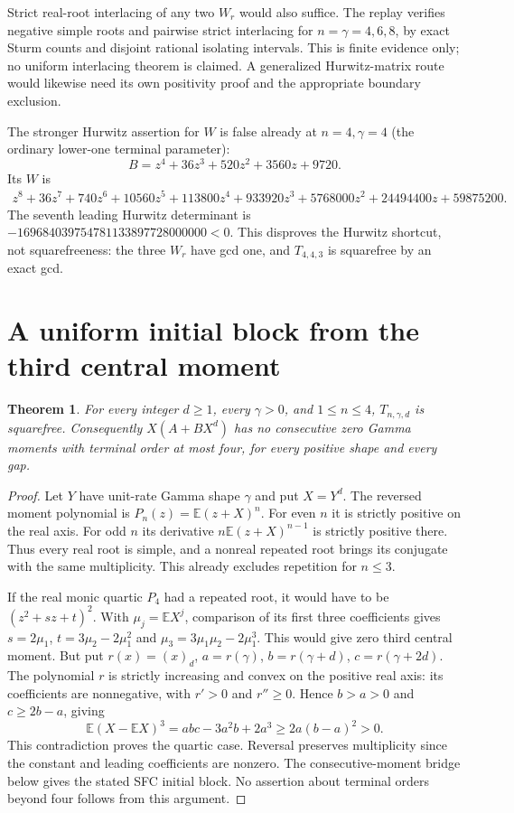 \documentclass[11pt]{article}
\newtheorem{theorem}{Theorem}
\begin{document}
Strict real-root interlacing of any two $W_r$ would also suffice.
The replay verifies negative simple roots and pairwise strict interlacing
for $n=\gamma=4,6,8$, by exact Sturm counts and disjoint rational
isolating intervals. This is finite evidence only; no uniform interlacing
theorem is claimed. A generalized Hurwitz-matrix route would likewise
need its own positivity proof and the appropriate boundary exclusion.

The stronger Hurwitz assertion for $W$ is false already at
$n=4,\gamma=4$ (the ordinary lower-one terminal parameter):
\[
 B=z^4+36z^3+520z^2+3560z+9720.
\]
Its $W$ is
\begin{align*}
 z^8+36z^7+740z^6+10560z^5+113800z^4
 +933920z^3+5768000z^2+24494400z+59875200.
\end{align*}
The seventh leading Hurwitz determinant is
$-169684039754781133897728000000<0$.
This disproves the Hurwitz shortcut, not squarefreeness: the three
$W_r$ have gcd one, and $T_{4,4,3}$ is squarefree by an exact gcd.

\section{A uniform initial block from the third central moment}
\begin{theorem}\label{thm:initial}
For every integer $d\ge1$, every $\gamma>0$, and $1\le n\le4$,
$T_{n,\gamma,d}$ is squarefree. Consequently $X(A+BX^d)$ has no
consecutive zero Gamma moments with terminal order at most four,
for every positive shape and every gap.
\end{theorem}
\begin{proof}
Let $Y$ have unit-rate Gamma shape $\gamma$ and put $X=Y^d$.
The reversed moment polynomial is $P_n(z)=\mathbb E(z+X)^n$.
For even $n$ it is strictly positive on the real axis. For odd $n$
its derivative $n\mathbb E(z+X)^{n-1}$ is strictly positive there.
Thus every real root is simple, and a nonreal repeated root brings its
conjugate with the same multiplicity. This already excludes repetition
for $n\le3$.

If the real monic quartic $P_4$ had a repeated root, it would have to be
$(z^2+sz+t)^2$. With $\mu_j=\mathbb EX^j$, comparison of its first
three coefficients gives $s=2\mu_1$, $t=3\mu_2-2\mu_1^2$ and
$\mu_3=3\mu_1\mu_2-2\mu_1^3$. This would give zero third central moment.
But put $r(x)=(x)_d$, $a=r(\gamma)$, $b=r(\gamma+d)$,
$c=r(\gamma+2d)$. The polynomial $r$ is strictly increasing and convex
on the positive real axis: its coefficients are nonnegative, with
$r'>0$ and $r''\ge0$. Hence $b>a>0$ and $c\ge2b-a$, giving
\[
 \mathbb E(X-\mathbb EX)^3
   =abc-3a^2b+2a^3\ge2a(b-a)^2>0.
\]
This contradiction proves the quartic case. Reversal preserves
multiplicity since the constant and leading coefficients are nonzero.
The consecutive-moment bridge below gives the stated SFC initial block.
No assertion about terminal orders beyond four follows from this argument.
\end{proof}
\end{document}
